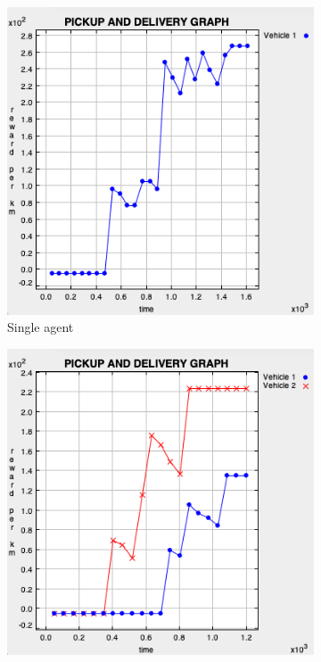 \documentclass[11pt]{article}
\begin{document}
\begin{figure}[ht]
\centering
  \begin{subfigure}[t]{0.175\textwidth}
    \includegraphics[width=\textwidth, frame]{9T1A.png}
    \caption{Single agent}
    \label{fig:2a}
  \end{subfigure}
  \begin{subfigure}[t]{0.175\textwidth}
    \includegraphics[width=\textwidth, frame]{9T2A.png}

\end{subfigure}
\end{figure}
\end{document}
